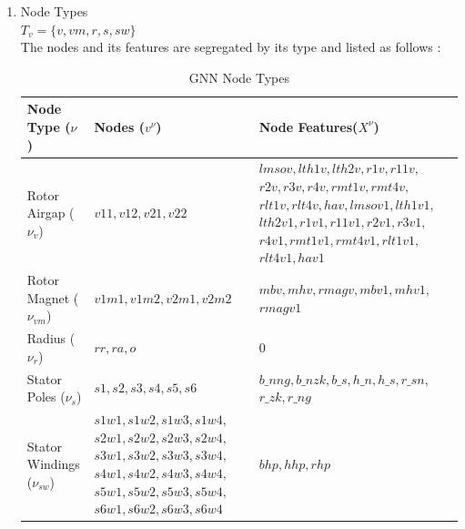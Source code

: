 \documentclass{report} %
\begin{document}
\begin{enumerate}
    \item Node Types \\
    \( T_v = \{ v, vm, r, s, sw\} \) \\
    The nodes and its features are segregated by its type and listed as follows :

    \begin{table}[H]
        \centering
        \begin{tabular}{|p{}|p{}|p{}|}
        \hline 
        {\bf Node Type (\(\nu\))} & {\bf Nodes (\( v^{\nu} \))} & {\bf Node Features(\( X^{\nu}\))}  \\
        \hline
        Rotor Airgap (\( \nu_v \)) & $v11, v12, v21, v22$ &
        $lmsov, lth1v, lth2v, r1v, r11v,$ \newline $ r2v, r3v, r4v, rmt1v, rmt4v, $ \newline $ rlt1v, rlt4v, hav,
        lmsov1, lth1v1,$ \newline $ lth2v1, r1v1, r11v1, r2v1, r3v1, $ \newline $ r4v1, rmt1v1, rmt4v1, rlt1v1, $ \newline $ rlt4v1, hav1$ \\
        \hline
        Rotor Magnet (\( \nu_{vm} \)) & 
        $v1m1, v1m2, v2m1, v2m2$ & 
        $mbv, mhv, rmagv, mbv1, mhv1, $ \newline $ rmagv1$ \\
        \hline
        Radius (\( \nu_r \)) & 
        $rr, ra, o$ & $0$ \\
        \hline
        Stator Poles (\( \nu_s \)) & 
        $s1, s2, s3, s4, s5, s6$ & 
        $b\_nng, b\_nzk, b\_s, h\_n, h\_s, r\_sn, $ \newline $ r\_zk, r\_ng$ \\
        \hline
        Stator Windings (\( \nu_{sw} \)) & 
        $s1w1, s1w2, s1w3, s1w4,$ \newline
        $s2w1, s2w2, s2w3, s2w4,$ \newline
        $s3w1, s3w2, s3w3, s3w4,$ \newline
        $s4w1, s4w2, s4w3, s4w4,$ \newline
        $s5w1, s5w2, s5w3, s5w4,$ \newline
        $s6w1, s6w2, s6w3, s6w4$ & 
        $bhp, hhp, rhp$ \\
        \hline
        \end{tabular}
        \caption{\ac{GNN} Node Types}
        \label{tab:GNN Node Types}
    \end{table}


\end{enumerate}
\end{document}
